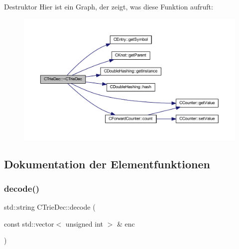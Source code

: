 Destruktor Hier ist ein Graph, der zeigt, was diese Funktion aufruft\+:
\nopagebreak
\begin{figure}[H]
\begin{center}
\leavevmode
\includegraphics[width=350pt]{class_c_trie_dec_a2e3dee1b9fae4e8fd82a7ba6247bb564_cgraph}
\end{center}
\end{figure}


\subsection{Dokumentation der Elementfunktionen}
\mbox{\label{class_c_trie_dec_a190f82222a2f7881b940066c54b00d38}} 
\subsubsection{\texorpdfstring{decode()}{decode()}}
{\footnotesize\ttfamily std\+::string C\+Trie\+Dec\+::decode (\begin{DoxyParamCaption}\item[{const std\+::vector$<$ unsigned int $>$ \&}]{enc }\end{DoxyParamCaption})}

